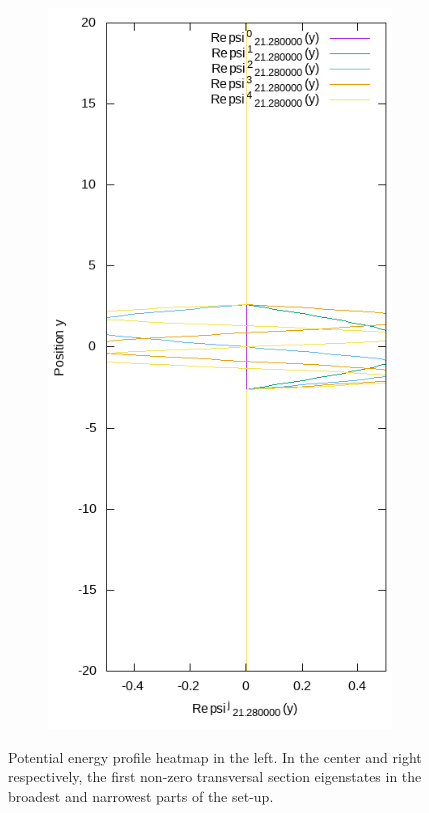 \documentclass[11pt, a4paper]{article} %
\begin{document}
\begin{figure}[h!]
\begin{subfigure}[b]{0.15\linewidth}
    \includegraphics[width=\linewidth]{Eig2.png}
  \end{subfigure}
  \caption{Potential energy profile heatmap in the left. In the center and right respectively, the first non-zero transversal section eigenstates in the broadest and narrowest parts of the set-up.}
  \label{fig:pot}
\end{figure}
\end{document}
